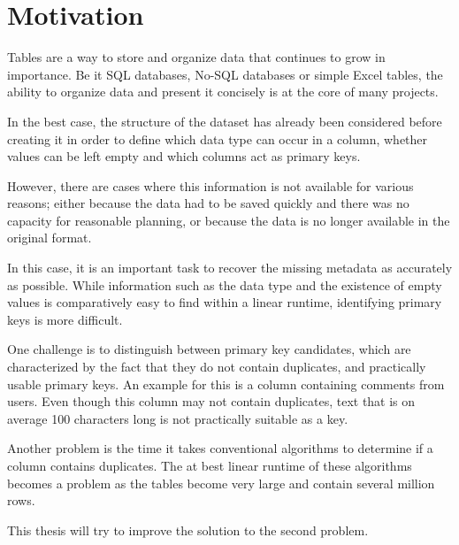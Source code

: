 \chapter{Motivation}
Tables are a way to store and organize data that continues to grow in importance. Be it SQL databases, No-SQL databases or simple Excel tables, the ability to organize data and present it concisely is at the core of many projects.

In the best case, the structure of the dataset has already been considered before creating it in order to define which data type can occur in a column, whether values can be left empty and which columns act as primary keys.

However, there are cases where this information is not available for various reasons; either because the data had to be saved quickly and there was no capacity for reasonable planning, or because the data is no longer available in the original format. %

In this case, it is an important task to recover the missing metadata as accurately as possible. While information such as the data type and the existence of empty values is comparatively easy to find within a linear runtime, identifying primary keys is more difficult.

One challenge is to distinguish between primary key candidates, which are characterized by the fact that they do not contain duplicates, and practically usable primary keys. An example for this is a column containing comments from users. Even though this column may not contain duplicates, text that is on average 100 characters long is not practically suitable as a key.

Another problem is the time it takes conventional algorithms to determine if a column contains duplicates. The at best linear runtime of these algorithms becomes a problem as the tables become very large and contain several million rows.

This thesis will try to improve the solution to the second problem. %

